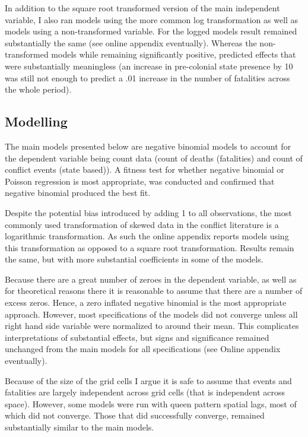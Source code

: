 \documentclass[12pt]{article}
\begin{document}
In addition to the square root transformed version of the main independent
variable, I also ran models using the more common log transformation as well as
models using a non-transformed variable. For the logged models result remained
substantially the same (see online appendix eventually). Whereas the
non-transformed models while remaining significantly positive, predicted effects
that were substantially meaningless (an increase in pre-colonial state presence
by 10 was still not enough to predict a .01 increase in the number of fatalities
across the whole period).

\subsection{Modelling}

The main models presented below are negative binomial models to account for the
dependent variable being count data (count of deaths (fatalities) and count of
conflict events (state based)). A fitness test for whether negative binomial or
Poisson regression is most appropriate, was conducted and confirmed that
negative binomial produced the best fit.

Despite the potential bias introduced by adding 1 to all observations, the most
commonly used transformation of skewed data in the conflict literature is a
logarithmic transformation. As such the online appendix reports models using
this transformation as opposed to a square root transformation. Results remain
the same, but with more substantial coefficients in some of the models.

Because there are a great number of zeroes in the dependent variable, as well
as for theoretical reasons there it is reasonable to assume that there are a
number of excess zeros. Hence, a zero inflated negative binomial is the most
appropriate approach. However, most specifications of the models did not
converge unless all right hand side variable were normalized to around their
mean. This complicates interpretations of substantial effects, but signs and
significance remained unchanged from the main models for all specifications (see
Online appendix eventually).

Because of the size of the grid cells I argue it is safe to assume that events
and fatalities are largely independent across grid cells (that is independent
across space). However, some models were run with queen pattern spatial lags,
most of which did not converge. Those that did successfully converge, remained
substantially similar to the main models.
\end{document}
